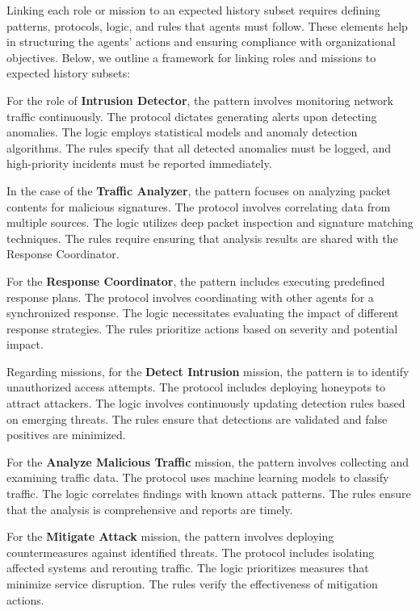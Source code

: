 \documentclass[conference]{IEEEtran}
\begin{document}
Linking each role or mission to an expected history subset requires defining patterns, protocols, logic, and rules that agents must follow. These elements help in structuring the agents' actions and ensuring compliance with organizational objectives. Below, we outline a framework for linking roles and missions to expected history subsets:

For the role of \textbf{Intrusion Detector}, the pattern involves monitoring network traffic continuously. The protocol dictates generating alerts upon detecting anomalies. The logic employs statistical models and anomaly detection algorithms. The rules specify that all detected anomalies must be logged, and high-priority incidents must be reported immediately.

In the case of the \textbf{Traffic Analyzer}, the pattern focuses on analyzing packet contents for malicious signatures. The protocol involves correlating data from multiple sources. The logic utilizes deep packet inspection and signature matching techniques. The rules require ensuring that analysis results are shared with the Response Coordinator.

For the \textbf{Response Coordinator}, the pattern includes executing predefined response plans. The protocol involves coordinating with other agents for a synchronized response. The logic necessitates evaluating the impact of different response strategies. The rules prioritize actions based on severity and potential impact.

Regarding missions, for the \textbf{Detect Intrusion} mission, the pattern is to identify unauthorized access attempts. The protocol includes deploying honeypots to attract attackers. The logic involves continuously updating detection rules based on emerging threats. The rules ensure that detections are validated and false positives are minimized.

For the \textbf{Analyze Malicious Traffic} mission, the pattern involves collecting and examining traffic data. The protocol uses machine learning models to classify traffic. The logic correlates findings with known attack patterns. The rules ensure that the analysis is comprehensive and reports are timely.

For the \textbf{Mitigate Attack} mission, the pattern involves deploying countermeasures against identified threats. The protocol includes isolating affected systems and rerouting traffic. The logic prioritizes measures that minimize service disruption. The rules verify the effectiveness of mitigation actions.
\end{document}
